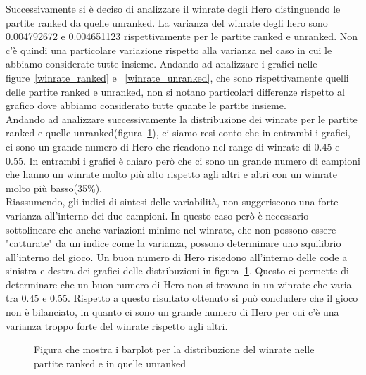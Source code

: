 Successivamente si è deciso di analizzare il winrate degli Hero distinguendo le partite ranked da quelle unranked. La varianza del winrate degli hero sono 0.004792672 e 0.004651123 rispettivamente per le partite ranked e unranked. Non c'è quindi una particolare variazione rispetto alla varianza nel caso in cui le abbiamo considerate tutte insieme. Andando ad analizzare i grafici nelle figure~\ref{winrate_ranked} e ~\ref{winrate_unranked}, che sono rispettivamente quelli delle partite ranked e unranked, non si notano particolari differenze rispetto al grafico dove abbiamo considerato tutte quante le partite insieme. \\
Andando ad analizzare successivamente la distribuzione dei winrate per le partite ranked e quelle unranked(figura~\ref{distribuzione_winrate_ranked_unranked}), ci siamo resi conto che in entrambi i grafici, ci sono un grande numero di Hero che ricadono nel range di winrate di 0.45 e 0.55. In entrambi i grafici è chiaro però che ci sono un grande numero di campioni che hanno un winrate molto più alto rispetto agli altri e altri con un winrate molto più basso(35\%). \\
Riassumendo, gli indici di sintesi delle variabilità, non suggeriscono una forte varianza all'interno dei due campioni. In questo caso però è necessario sottolineare che anche variazioni minime nel winrate, che non possono essere "catturate" da un indice come la varianza, possono determinare uno squilibrio all'interno del gioco. Un buon numero di Hero risiedono all'interno delle code a sinistra e destra dei grafici delle distribuzioni in figura~\ref{distribuzione_winrate_ranked_unranked}. Questo ci permette di determinare che un buon numero di Hero non si trovano in un winrate che varia tra 0.45 e 0.55. Rispetto a questo risultato ottenuto si può concludere che il gioco non è bilanciato, in quanto ci sono un grande numero di Hero per cui c'è una varianza troppo forte del winrate rispetto agli altri.
\begin{figure}[htbp]
\begin{center}

\caption{Figura che mostra i barplot per la distribuzione del winrate nelle partite ranked e in quelle unranked}
\label{distribuzione_winrate_ranked_unranked}
\end{center}
\end{figure}